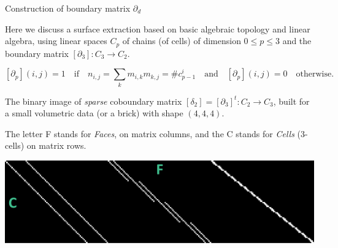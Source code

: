 \documentclass[10pt]{beamer}
\begin{document}
\begin{frame}{Construction of boundary matrix $\partial_d$}

Here we discuss a surface extraction based on basic algebraic topology and linear algebra, using linear spaces $C_p$ of chains (of cells) of dimension $0 \leq p \leq 3$ and the boundary matrix $[\partial_3] : C_3 \to C_2$.
    
\[
[\partial_p](i,j)=1\quad\mbox{if}\quad n_{i,j} = \sum_{k} m_{i,k}m_{k,j}=\texttt{\#}c^i_{p-1} \quad\mbox{and}\quad [\partial_p](i,j)=0 \quad\mbox{otherwise}.  
\]


   The binary image of \emph{sparse} coboundary matrix  $\left[\delta_2\right] = \left[\partial_3\right]^t : C_2 \to C_3$,
   built for a small volumetric data (or a brick) with shape $(4,4,4)$. 
   
   The letter F stands for \emph{Faces}, on matrix columns, and the C stands for \emph{Cells} (3-cells) on matrix rows.

\begin{center}
  \includegraphics[width=0.75\linewidth]{figs/boundary_matrix_4x4x4_desc.png} 
\end{center}
  

\end{frame}
\end{document}
